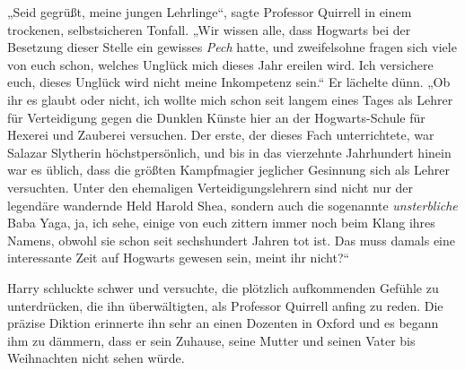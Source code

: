 „Seid gegrüßt, meine jungen Lehrlinge“, sagte Professor Quirrell in einem trockenen, selbstsicheren Tonfall. „Wir wissen alle, dass Hogwarts bei der Besetzung dieser Stelle ein gewisses \emph{Pech} hatte, und zweifelsohne fragen sich viele von euch schon, welches Unglück mich dieses Jahr ereilen wird. Ich versichere euch, dieses Unglück wird nicht meine Inkompetenz sein.“ Er lächelte dünn. „Ob ihr es glaubt oder nicht, ich wollte mich schon seit langem eines Tages als Lehrer für Verteidigung gegen die Dunklen Künste hier an der Hogwarts-Schule für Hexerei und Zauberei versuchen. Der erste, der dieses Fach unterrichtete, war Salazar Slytherin höchstpersönlich, und bis in das vierzehnte Jahrhundert hinein war es üblich, dass die größten Kampfmagier jeglicher Gesinnung sich als Lehrer versuchten. Unter den ehemaligen Verteidigungslehrern sind nicht nur der legendäre wandernde Held Harold Shea, sondern auch die sogenannte \emph{unsterbliche} Baba Yaga, ja, ich sehe, einige von euch zittern immer noch beim Klang ihres Namens, obwohl sie schon seit sechshundert Jahren tot ist. Das muss damals eine interessante Zeit auf Hogwarts gewesen sein, meint ihr nicht?“

Harry schluckte schwer und versuchte, die plötzlich aufkommenden Gefühle zu unterdrücken, die ihn überwältigten, als Professor Quirrell anfing zu reden. Die präzise Diktion erinnerte ihn sehr an einen Dozenten in Oxford und es begann ihm zu dämmern, dass er sein Zuhause, seine Mutter und seinen Vater bis Weihnachten nicht sehen würde.

